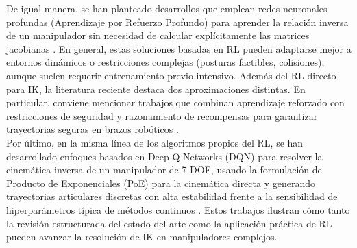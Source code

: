 De igual manera, se han planteado desarrollos que emplean redes neuronales profundas (Aprendizaje por Refuerzo Profundo) para aprender la relación inversa de un manipulador sin necesidad de calcular explícitamente las matrices jacobianas \parencite{liu2021deep}. En general, estas soluciones basadas en RL pueden adaptarse mejor a entornos dinámicos o restricciones complejas (posturas factibles, colisiones), aunque suelen requerir entrenamiento previo intensivo. Además del RL directo para IK, la literatura reciente destaca dos aproximaciones distintas. En particular, conviene mencionar trabajos que combinan aprendizaje reforzado con restricciones de seguridad y razonamiento de recompensas para garantizar trayectorias seguras en brazos robóticos \parencite{ozalp2024advancements}. \\

Por último, en la misma línea de los algoritmos propios del RL, se han desarrollado enfoques basados en Deep Q-Networks (DQN) para resolver la cinemática inversa de un manipulador de 7 DOF, usando la formulación de Producto de Exponenciales (PoE) para la cinemática directa y generando trayectorias articulares discretas con alta estabilidad frente a la sensibilidad de hiperparámetros típica de métodos continuos \parencite{malik2022deeprl}. Estos trabajos ilustran cómo tanto la revisión estructurada del estado del arte como la aplicación práctica de RL pueden avanzar la resolución de IK en manipuladores complejos.\\
